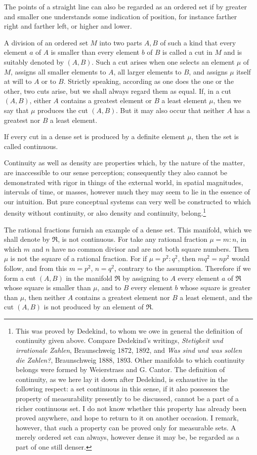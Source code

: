 \documentclass[11pt]{article}
\begin{document}
The points of a straight line can also be regarded as an ordered set if by greater and smaller one understands some indication of position, for instance farther right and farther left, or higher and lower.

A division of an ordered set $M$ into two parts $A,B$ of such a kind that every element $a$ of $A$ is smaller than every element $b$ of $B$ is called a cut in $M$ and is suitably denoted by $(A,B)$. Such a cut arises when one selects an element $\mu$ of $M$, assigns all smaller elements to $A$, all larger elements to $B$, and assigns $\mu$ itself at will to $A$ or to $B$. Strictly speaking, according as one does the one or the other, two cuts arise, but we shall always regard them as equal. If, in a cut $(A,B)$, either $A$ contains a greatest element or $B$ a least element $\mu$, then we say that $\mu$ produces the cut $(A,B)$. But it may also occur that neither $A$ has a greatest nor $B$ a least element.

If every cut in a dense set is produced by a definite element $\mu$, then the set is called continuous.

Continuity as well as density are properties which, by the nature of the matter, are inaccessible to our sense perception; consequently they also cannot be demonstrated with rigor in things of the external world, in spatial magnitudes, intervals of time, or masses, however much they may seem to lie in the essence of our intuition. But pure conceptual systems can very well be constructed to which density without continuity, or also density and continuity, belong.\footnote{This was proved by Dedekind, to whom we owe in general the definition of continuity given above. Compare Dedekind's writings, \emph{Stetigkeit und irrationale Zahlen}, Braunschweig 1872, 1892, and \emph{Was sind und was sollen die Zahlen?}, Braunschweig 1888, 1893. Other manifolds to which continuity belongs were formed by Weierstrass and G. Cantor. The definition of continuity, as we here lay it down after Dedekind, is exhaustive in the following respect: a set continuous in this sense, if it also possesses the property of measurability presently to be discussed, cannot be a part of a richer continuous set. I do not know whether this property has already been proved anywhere, and hope to return to it on another occasion. I remark, however, that such a property can be proved only for measurable sets. A merely ordered set can always, however dense it may be, be regarded as a part of one still denser.}

The rational fractions furnish an example of a dense set. This manifold, which we shall denote by $\mathfrak R$, is not continuous. For take any rational fraction $\mu=m:n$, in which $m$ and $n$ have no common divisor and are not both square numbers. Then $\mu$ is not the square of a rational fraction. For if $\mu=p^2:q^2$, then $mq^2=np^2$ would follow, and from this $m=p^2$, $n=q^2$, contrary to the assumption. Therefore if we form a cut $(A,B)$ in the manifold $\mathfrak R$ by assigning to $A$ every element $a$ of $\mathfrak R$ whose square is smaller than $\mu$, and to $B$ every element $b$ whose square is greater than $\mu$, then neither $A$ contains a greatest element nor $B$ a least element, and the cut $(A,B)$ is not produced by an element of $\mathfrak R$.
\end{document}
